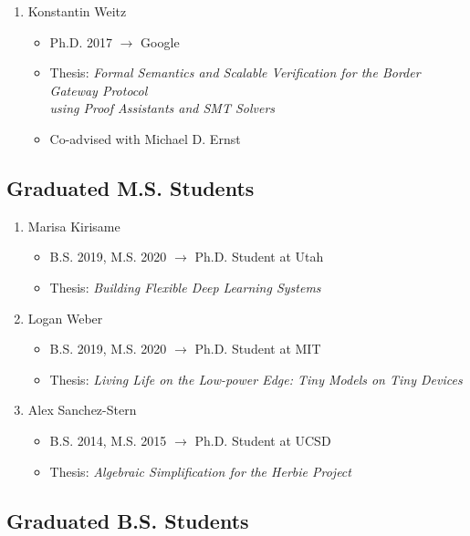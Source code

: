 \documentclass[10pt]{article}
\begin{document}
\begin{enumerate}[resume]
  \item Konstantin Weitz
    \begin{itemize}
      \item Ph.D. 2017 $\rightarrow$ Google
      \item Thesis: \textit{Formal Semantics and Scalable Verification for the Border Gateway Protocol} \\
        \phantom{Thesis:\,} \textit{using Proof Assistants and SMT Solvers}
      \item Co-advised with Michael D. Ernst
    \end{itemize}
\end{enumerate}

\subsection*{Graduated M.S. Students}

\begin{enumerate}[resume]
  \item Marisa Kirisame
    \begin{itemize}
      \item B.S. 2019, M.S. 2020 $\rightarrow$ Ph.D. Student at Utah
      \item Thesis: \textit{Building Flexible Deep Learning Systems}
    \end{itemize}

  \item Logan Weber
    \begin{itemize}
      \item B.S. 2019, M.S. 2020 $\rightarrow$ Ph.D. Student at MIT
      \item Thesis: \textit{Living Life on the Low-power Edge: Tiny Models on Tiny Devices}
    \end{itemize}

  \item Alex Sanchez-Stern
    \begin{itemize}
      \item B.S. 2014, M.S. 2015 $\rightarrow$ Ph.D. Student at UCSD
      \item Thesis: \textit{Algebraic Simplification for the Herbie Project}
    \end{itemize}
\end{enumerate}

\subsection*{Graduated B.S. Students}
\end{document}
